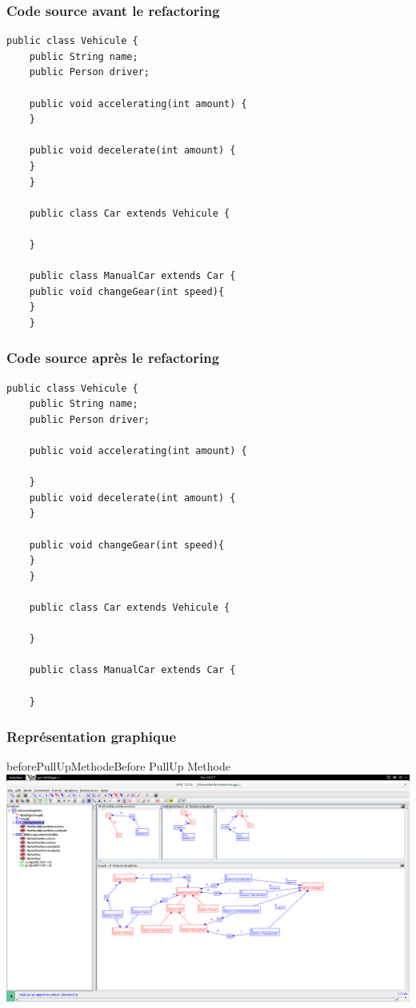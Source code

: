 \documentclass[a4paper, 12pt]{article}
\begin{document}
  \subsubsection{Code source avant le refactoring}
  \begin{lstlisting}[frame=single]
    public class Vehicule {
    public String name;
    public Person driver;

    public void accelerating(int amount) {
    }

    public void decelerate(int amount) {
    }
    }

    public class Car extends Vehicule {

    }

    public class ManualCar extends Car {
    public void changeGear(int speed){
    }
    }
  \end{lstlisting}

  \subsubsection{Code source après le refactoring}
  \begin{lstlisting}[frame=single]
    public class Vehicule {
    public String name;
    public Person driver;

    public void accelerating(int amount) {

    }
    public void decelerate(int amount) {
    }

    public void changeGear(int speed){
    }
    }

    public class Car extends Vehicule {

    }

    public class ManualCar extends Car {

    }
  \end{lstlisting}

  \subsubsection{Représentation graphique}

  \begin{myfig}{beforePullUpMethode}{Before PullUp Methode}
    \includegraphics[width=\textwidth]{beforePullUpMethode.png}
  \end{myfig}
\end{document}
